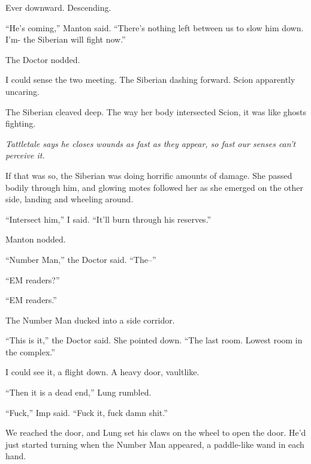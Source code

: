 Ever downward.  Descending.



``He's coming,'' Manton said.  ``There's nothing left between us to slow him down.  I'm- the Siberian will fight now.''



The Doctor nodded.



I could sense the two meeting.  The Siberian dashing forward.  Scion apparently uncaring.



The Siberian cleaved deep.  The way her body intersected Scion, it was like ghosts fighting.



\emph{Tattletale says he closes wounds as fast as they appear, so fast our senses can't perceive it.}



If that was so, the Siberian was doing horrific amounts of damage.  She passed bodily through him, and glowing motes followed her as she emerged on the other side, landing and wheeling around.



``Intersect him,'' I said.  ``It'll burn through his reserves.''



Manton nodded.



``Number Man,'' the Doctor said.  ``The--''



``EM readers?''



``EM readers.''



The Number Man ducked into a side corridor.



``This is it,'' the Doctor said.  She pointed down.  ``The last room.  Lowest room in the complex.''



I could see it, a flight down.  A heavy door, vaultlike.



``Then it is a dead end,'' Lung rumbled.



``Fuck,'' Imp said.  ``Fuck it, fuck damn shit.''



We reached the door, and Lung set his claws on the wheel to open the door.  He'd just started turning when the Number Man appeared, a paddle-like wand in each hand.



